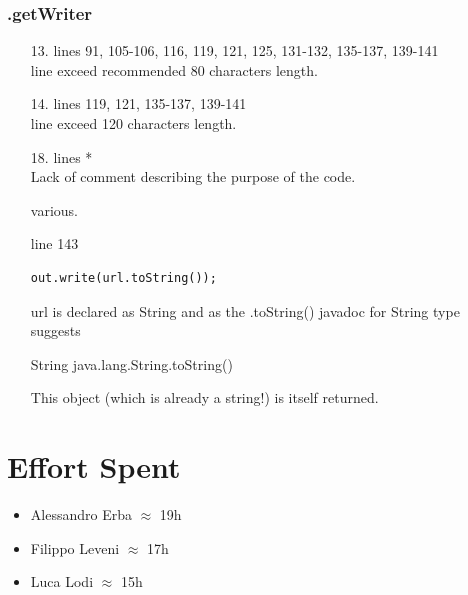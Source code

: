 \documentclass[english]{article}
\begin{document}
\subsubsection*{.getWriter}
\begin{itemize}



\item[13.]{lines 91, 105-106, 116, 119, 121, 125, 131-132, 135-137, 139-141\\
		line exceed recommended 80 characters length.}

\item[14.]{lines  119, 121, 135-137, 139-141\\
		line exceed 120 characters length.}

\item[18.]{lines  *\\
		Lack of comment describing the purpose of the code.}

 \item[various.]{line 143
		\begin{lstlisting} 
out.write(url.toString());
		\end{lstlisting}
		url is declared as String and as the .toString() javadoc for String type suggests 
\begin{displayquote}
		String java.lang.String.toString()

This object (which is already a string!) is itself returned.
\end{displayquote}}
\end{itemize}





\clearpage
\section{Effort Spent} %
	\begin{itemize}
		\item Alessandro Erba $\approx$ 19h
		\item Filippo Leveni 	$\approx$ 17h
		\item Luca Lodi $\approx$ 15h
	\end{itemize}
\end{document}
